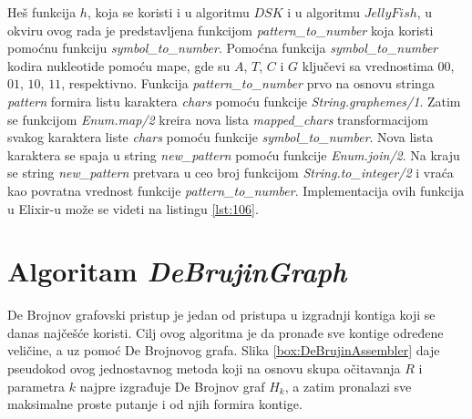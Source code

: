 \documentclass[12pt,oneside]{memoir}
\begin{document}


Heš funkcija $h$, koja se koristi i u algoritmu $DSK$ i u algoritmu $JellyFish$, u okviru ovog rada je predstavljena funkcijom \textit{pattern\_to\_number} koja koristi pomoćnu funkciju \textit{symbol\_to\_number}. Pomoćna funkcija \textit{symbol\_to\_number} kodira nukleotide pomoću mape, gde su $A$, $T$, $C$ i $G$ ključevi sa vrednostima $00$, $01$, $10$, $11$, respektivno. Funkcija \textit{pattern\_to\_number} prvo na osnovu stringa \textit{pattern} formira listu karaktera \textit{chars} pomoću funkcije \textit{String.graphemes/1}. Zatim se funkcijom \textit{Enum.map/2} kreira nova lista \textit{mapped\_chars} transformacijom svakog karaktera liste \textit{chars} pomoću funkcije \textit{symbol\_to\_number}. Nova lista karaktera se spaja u string \textit{new\_pattern} pomoću funkcije \textit{Enum.join/2}. Na kraju se string \textit{new\_pattern} pretvara u ceo broj funkcijom \textit{String.to\_integer/2} i vraća kao povratna vrednost funkcije \textit{pattern\_to\_number}. Implementacija ovih funkcija u Elixir-u može se videti na listingu \ref{lst:106}.



\section{Algoritam \textit{DeBrujinGraph}}
\label{odeljak:ImplementacijaDB}

De Brojnov grafovski pristup je jedan od pristupa u izgradnji kontiga koji se danas najčešće koristi. Cilj ovog algoritma je da pronađe sve kontige određene veličine, a uz pomoć De Brojnovog grafa. Slika \ref{box:DeBrujinAssembler} daje pseudokod ovog jednostavnog metoda koji na osnovu skupa očitavanja $R$ i parametra $k$ najpre izgrađuje De Brojnov graf $H_k$, a zatim pronalazi sve maksimalne proste putanje i od njih formira kontige.
\end{document}
